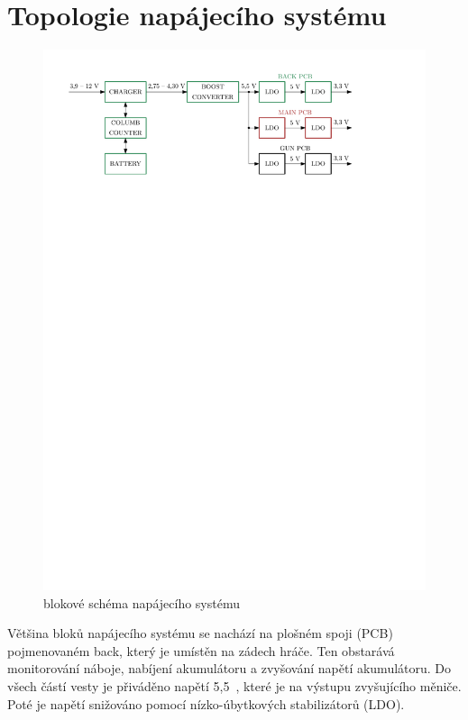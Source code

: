 \section{Topologie napájecího systému}
\begin{figure}[H]
    \begin{center}
        \includegraphics[width=\textwidth]{img/power-system}
    \end{center}
    \caption{blokové schéma napájecího systému}
\end{figure}

Většina bloků napájecího systému se nachází na plošném spoji (PCB) pojmenovaném back, který je umístěn na zádech hráče. Ten obstarává monitorování náboje, nabíjení akumulátoru a zvyšování napětí akumulátoru. Do všech částí vesty je přiváděno napětí 5,5~, které je na výstupu zvyšujícího měniče. Poté je napětí snižováno pomocí nízko-úbytkových stabilizátorů (LDO).
